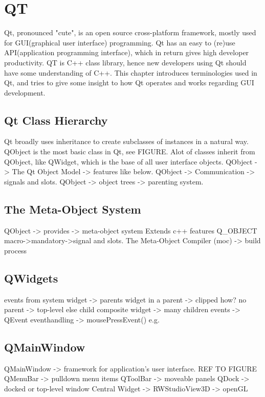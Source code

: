 \section{QT}
Qt, pronounced "cute", is an open source cross-platform framework, mostly used for GUI(graphical user interface) programming. Qt has an easy to (re)use API(application programming interface), which in return gives high developer productivity. QT is C++ class library, hence new developers using Qt should have some understanding of C++.
This chapter introduces terminologies used in Qt, and tries to give some insight to how Qt operates and works regarding GUI development.  




\subsection{Qt Class Hierarchy}
Qt broadly uses inheritance to create subclasses of instances in a natural way. QObject is the most basic class in Qt, see FIGURE. Alot of classes inherit from QObject, like QWidget, which is the base of all user interface objects. 
QObject -> The Qt Object Model -> features like below.
QObject -> Communication -> signals and slots. 
QObject -> object trees -> parenting system.

\subsection{The Meta-Object System}
QObject -> provides -> meta-object system
Extends c++ features
Q_OBJECT macro->mandatory->signal and slots.
The Meta-Object Compiler (moc) -> build process

\subsection{QWidgets}
events from system
widget -> parents
widget in a parent -> clipped how?
no parent -> top-level else child
composite widget -> many children
events -> QEvent eventhandling -> mousePressEvent() e.g.

\subsection{QMainWindow}
QMainWindow -> framework for application's user interface. REF TO FIGURE
QMenuBar -> pulldown menu items
QToolBar -> moveable panels
QDock -> docked or top-level window
Central Widget -> RWStudioView3D -> openGL

